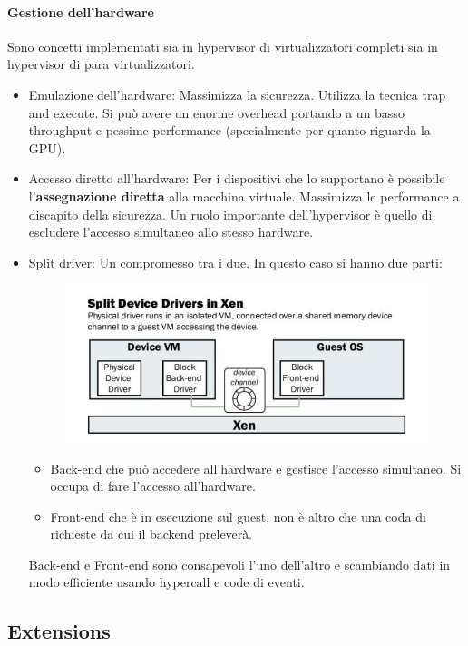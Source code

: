 \documentclass{article}
\begin{document}
		\paragraph{Gestione dell'hardware}
		Sono concetti implementati sia in hypervisor di virtualizzatori completi sia in hypervisor di para virtualizzatori.
		\begin{itemize}
		    \item Emulazione dell'hardware: Massimizza la sicurezza. Utilizza la tecnica trap and execute. Si può avere un enorme overhead portando a un basso throughput e pessime performance (specialmente per quanto riguarda la GPU). 
		    \item Accesso diretto all'hardware: Per i dispositivi che lo supportano è possibile l'\textbf{assegnazione diretta} alla macchina virtuale. Massimizza le performance a discapito della sicurezza. Un ruolo importante dell'hypervisor è quello di escludere l'accesso simultaneo allo stesso hardware.
		    \item Split driver: Un compromesso tra i due. In questo caso si hanno due parti:
		    \begin{figure}[ht]
		    	\centering
		    	\includegraphics[width=0.7\linewidth]{images/SAC_B1_splitdriver}
		    	\label{fig:sacb1splitdriver}
		    \end{figure}
		    \begin{itemize}
		        \item Back-end che può accedere all'hardware e gestisce l'accesso simultaneo. Si occupa di fare l'accesso all'hardware.
		        \item Front-end che è in esecuzione sul guest, non è altro che una coda di richieste da cui il backend preleverà.
		    \end{itemize}
		    
		    Back-end e Front-end sono consapevoli l'uno dell'altro e scambiando dati in modo efficiente usando hypercall e code di eventi.
		\end{itemize}
		
		\subsection{Extensions}
\end{document}
